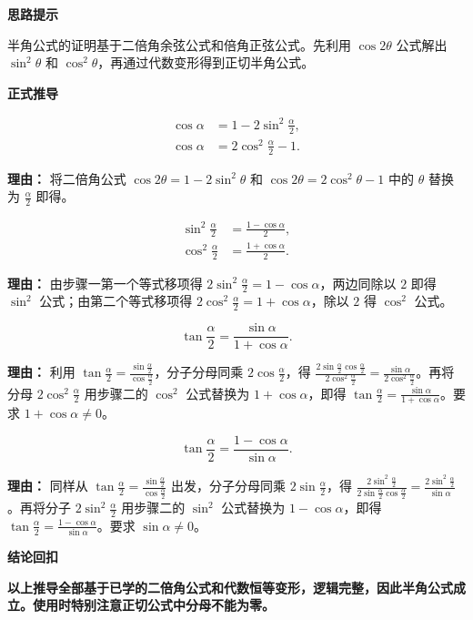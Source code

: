 \begin{proofbox}

	\textbf{\textcolor{CProof}{思路提示}}

	半角公式的证明基于二倍角余弦公式和倍角正弦公式。先利用 $\cos2\theta$ 公式解出 $\sin^2\theta$ 和 $\cos^2\theta$，再通过代数变形得到正切半角公式。

	\medskip
	\textbf{\textcolor{CProof}{正式推导}}
	\begin{description}[style=nextline, leftmargin=2.8em, labelsep=0.5em, itemsep=0.55em]
		\item[\textbf{步骤一（写出倍角关系）：}]
			\[
				\begin{aligned}
					\cos\alpha &= 1-2\sin^2\frac{\alpha}{2},\\
					\cos\alpha &= 2\cos^2\frac{\alpha}{2}-1.
			\end{aligned}
			\]
			\par\textbf{理由：}
			将二倍角公式 $\cos2\theta = 1-2\sin^2\theta$ 和 $\cos2\theta = 2\cos^2\theta-1$ 中的 $\theta$ 替换为 $\frac{\alpha}{2}$ 即得。

		\item[\textbf{步骤二（解出半角平方）：}]
			\[
				\begin{aligned}
					\sin^2\frac{\alpha}{2} &= \frac{1-\cos\alpha}{2},\\
					\cos^2\frac{\alpha}{2} &= \frac{1+\cos\alpha}{2}.
			\end{aligned}
			\]
			\par\textbf{理由：}
			由步骤一第一个等式移项得 $2\sin^2\frac{\alpha}{2}=1-\cos\alpha$，两边同除以 $2$ 即得 $\sin^2$ 公式；由第二个等式移项得 $2\cos^2\frac{\alpha}{2}=1+\cos\alpha$，除以 $2$ 得 $\cos^2$ 公式。

		\item[\textbf{步骤三（推正切形式一）：}]
			\[
				\tan\frac{\alpha}{2} = \frac{\sin\alpha}{1+\cos\alpha}.
			\]
			\par\textbf{理由：}
			利用 $\tan\frac{\alpha}{2} = \frac{\sin\frac{\alpha}{2}}{\cos\frac{\alpha}{2}}$，分子分母同乘 $2\cos\frac{\alpha}{2}$，得 $\frac{2\sin\frac{\alpha}{2}\cos\frac{\alpha}{2}}{2\cos^2\frac{\alpha}{2}} = \frac{\sin\alpha}{2\cos^2\frac{\alpha}{2}}$。再将分母 $2\cos^2\frac{\alpha}{2}$ 用步骤二的 $\cos^2$ 公式替换为 $1+\cos\alpha$，即得 $\tan\frac{\alpha}{2} = \frac{\sin\alpha}{1+\cos\alpha}$。要求 $1+\cos\alpha\neq 0$。

		\item[\textbf{步骤四（推正切形式二）：}]
			\[
				\tan\frac{\alpha}{2} = \frac{1-\cos\alpha}{\sin\alpha}.
			\]
			\par\textbf{理由：}
			同样从 $\tan\frac{\alpha}{2} = \frac{\sin\frac{\alpha}{2}}{\cos\frac{\alpha}{2}}$ 出发，分子分母同乘 $2\sin\frac{\alpha}{2}$，得 $\frac{2\sin^2\frac{\alpha}{2}}{2\sin\frac{\alpha}{2}\cos\frac{\alpha}{2}} = \frac{2\sin^2\frac{\alpha}{2}}{\sin\alpha}$。再将分子 $2\sin^2\frac{\alpha}{2}$ 用步骤二的 $\sin^2$ 公式替换为 $1-\cos\alpha$，即得 $\tan\frac{\alpha}{2} = \frac{1-\cos\alpha}{\sin\alpha}$。要求 $\sin\alpha\neq 0$。
	\end{description}

	\medskip
	\textbf{\textcolor{CProof}{结论回扣}}

	\textbf{以上推导全部基于已学的二倍角公式和代数恒等变形，逻辑完整，因此半角公式成立。使用时特别注意正切公式中分母不能为零。}
\end{proofbox}
